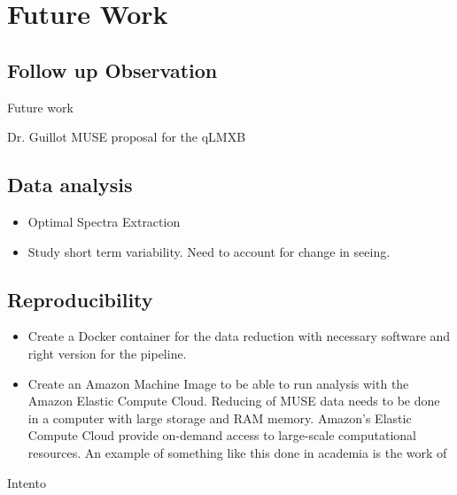\chapter{Future Work}\label{chap:future}
\thispagestyle{fancy}

\section{Follow up Observation}

Future work 


    Dr. Guillot MUSE proposal for the qLMXB
    
\section{Data analysis}
    
    \begin{itemize}
\item Optimal Spectra Extraction \citep{horne_emission_1986}
\item Study short term variability. Need to account for change in seeing.
\end{itemize}

\section{Reproducibility}
\begin{itemize}
\item  Create a Docker container for the data reduction with necessary software and right version for the pipeline. 
\item Create an Amazon Machine Image to be able to run analysis with the Amazon Elastic Compute Cloud. Reducing of MUSE data needs to be done in a computer with large storage and RAM memory. Amazon's Elastic Compute Cloud provide on-demand access to large-scale computational resources. An example of something like this done in academia is the work of \cite{ragan-kelley_collaborative_2013}
\end{itemize}

Intento
